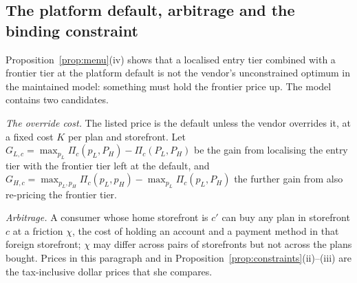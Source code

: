 \documentclass[11pt]{article}
\theoremstyle{definition}
\theoremstyle{remark}
\begin{document}
\subsection{The platform default, arbitrage and the binding constraint}\label{app:constraints}

Proposition~\ref{prop:menu}(iv) shows that a localised entry tier combined with a frontier tier at the platform default is not the vendor's unconstrained optimum in the maintained model: something must hold the frontier price up. The model contains two candidates.

\emph{The override cost.} The listed price is the default unless the vendor overrides it, at a fixed cost $K$ per plan and storefront. Let $G_{L,c}=\max_{p_L}\Pi_c(p_L,P_H)-\Pi_c(P_L,P_H)$ be the gain from localising the entry tier with the frontier tier left at the default, and $G_{H,c}=\max_{p_L,p_H}\Pi_c(p_L,p_H)-\max_{p_L}\Pi_c(p_L,P_H)$ the further gain from also re-pricing the frontier tier.

\emph{Arbitrage.} A consumer whose home storefront is $c'$ can buy any plan in storefront $c$ at a friction $\chi$, the cost of holding an account and a payment method in that foreign storefront; $\chi$ may differ across pairs of storefronts but not across the plans bought. Prices in this paragraph and in Proposition~\ref{prop:constraints}(ii)--(iii) are the tax-inclusive dollar prices that she compares.
\end{document}
